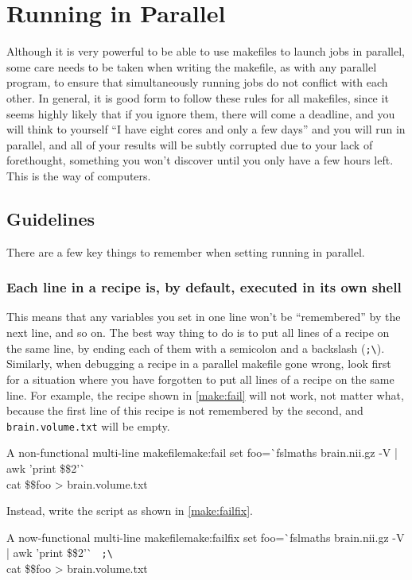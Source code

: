 \chapter{Running \maken{} in Parallel}
\label{chap:parallel}

Although it is very powerful to be able to use makefiles to launch jobs in parallel, some care needs to be taken when writing the makefile, as with any parallel program, to ensure that simultaneously running jobs do not conflict with each other. In general, it is good form to follow these rules for all makefiles, since it seems highly likely that if you ignore them, there will come a deadline, and you will think to yourself ``I have eight cores and only a few days'' and you will run \maken{} in parallel, and all of your results will be subtly corrupted due to your lack of forethought, something you won't discover until you only have a few hours left. This is the way of computers.

\section{Guidelines}

There are a few key things to remember when setting running \maken{} in parallel.

\subsection{Each line in a recipe is, by default, executed in its own shell}

This means that any variables you set in one line won't be ``remembered'' by the next line, and so on. The best way thing to do is to put all lines of a recipe on the same line, by ending each of them with a semicolon and a backslash (\texttt{;\textbackslash}). Similarly, when debugging a recipe in a parallel makefile gone wrong, look first for a situation where you have forgotten to put all lines of a recipe on the same line. For example, the recipe shown in \autoref{make:fail} will not work, not matter what, because the first line of this recipe is not remembered by the second, and \texttt{brain.volume.txt} will be empty.
\begin{make}{A non-functional multi-line makefile}{make:fail}
	set foo=\`{}fslmaths brain.nii.gz -V | awk '{print \$\$2}'\`{} \\
	cat \$\$foo > brain.volume.txt
\end{make}


Instead, write the script as shown in \autoref{make:failfix}.
\begin{make}{A now-functional multi-line makefile}{make:failfix}
	set foo=\`{}fslmaths brain.nii.gz -V | awk '{print \$\$2}'\`{} \texttt{{\color{red} ;\textbackslash}} \\
	cat \$\$foo > brain.volume.txt
\end{make}

